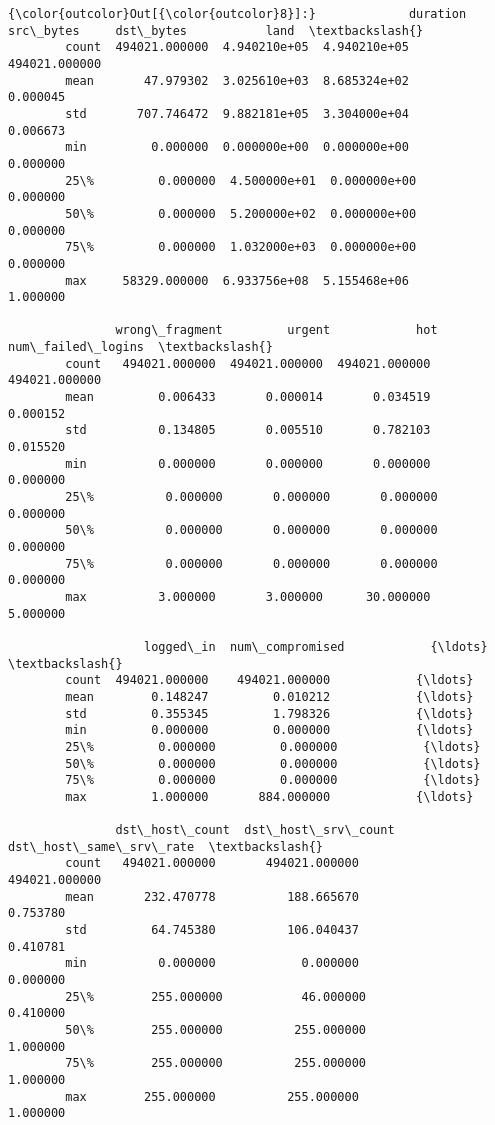 \documentclass[11pt]{article}
\begin{document}
\begin{Verbatim}[commandchars=\\\{\}]
{\color{outcolor}Out[{\color{outcolor}8}]:}             duration     src\_bytes     dst\_bytes           land  \textbackslash{}
        count  494021.000000  4.940210e+05  4.940210e+05  494021.000000   
        mean       47.979302  3.025610e+03  8.685324e+02       0.000045   
        std       707.746472  9.882181e+05  3.304000e+04       0.006673   
        min         0.000000  0.000000e+00  0.000000e+00       0.000000   
        25\%         0.000000  4.500000e+01  0.000000e+00       0.000000   
        50\%         0.000000  5.200000e+02  0.000000e+00       0.000000   
        75\%         0.000000  1.032000e+03  0.000000e+00       0.000000   
        max     58329.000000  6.933756e+08  5.155468e+06       1.000000   
        
               wrong\_fragment         urgent            hot  num\_failed\_logins  \textbackslash{}
        count   494021.000000  494021.000000  494021.000000      494021.000000   
        mean         0.006433       0.000014       0.034519           0.000152   
        std          0.134805       0.005510       0.782103           0.015520   
        min          0.000000       0.000000       0.000000           0.000000   
        25\%          0.000000       0.000000       0.000000           0.000000   
        50\%          0.000000       0.000000       0.000000           0.000000   
        75\%          0.000000       0.000000       0.000000           0.000000   
        max          3.000000       3.000000      30.000000           5.000000   
        
                   logged\_in  num\_compromised            {\ldots}             \textbackslash{}
        count  494021.000000    494021.000000            {\ldots}              
        mean        0.148247         0.010212            {\ldots}              
        std         0.355345         1.798326            {\ldots}              
        min         0.000000         0.000000            {\ldots}              
        25\%         0.000000         0.000000            {\ldots}              
        50\%         0.000000         0.000000            {\ldots}              
        75\%         0.000000         0.000000            {\ldots}              
        max         1.000000       884.000000            {\ldots}              
        
               dst\_host\_count  dst\_host\_srv\_count  dst\_host\_same\_srv\_rate  \textbackslash{}
        count   494021.000000       494021.000000           494021.000000   
        mean       232.470778          188.665670                0.753780   
        std         64.745380          106.040437                0.410781   
        min          0.000000            0.000000                0.000000   
        25\%        255.000000           46.000000                0.410000   
        50\%        255.000000          255.000000                1.000000   
        75\%        255.000000          255.000000                1.000000   
        max        255.000000          255.000000                1.000000   
        

\end{Verbatim}
\end{document}

